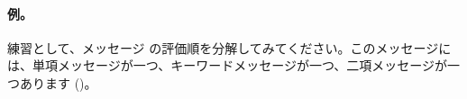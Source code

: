 \documentclass[a4paper,10pt,twoside]{book}
\begin{document}




\paragraph{例。} 練習として、メッセージ  の評価順を分解してみてください。このメッセージには、単項メッセージが一つ、キーワードメッセージが一つ、二項メッセージが一つあります ()。

\end{document}
